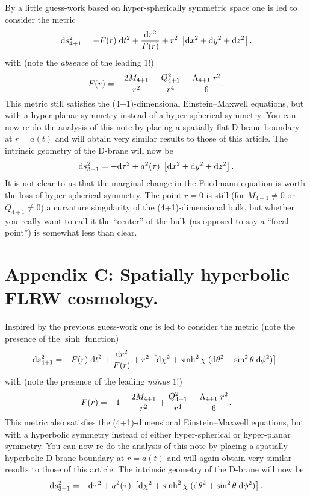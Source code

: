 \documentclass[a4paper,12pt]{article}
\begin{document}
By a little guess-work based on hyper-spherically symmetric {\RNdS}
space one is led to consider the metric
%
\begin{equation}
{\mathrm d} s^2_{4+1} = 
-  F(r)\; {\mathrm d} t^2 
+{{\mathrm d} r^2\over F(r)} 
+ r^2 \; \left[{\mathrm d} x^2 + {\mathrm d} y^2 + {\mathrm d} z^2 \right].
\end{equation}
%
with (note the {\em absence} of the leading $1$!)
%
\begin{equation}
F(r) =  - {2M_{4+1}\over r^2} 
+ {Q_{4+1}^2\over r^4} - {\Lambda_{4+1} \; r^2\over 6}.
\end{equation}
%
This metric still satisfies the (4+1)-dimensional Einstein--Maxwell
equations, but with a hyper-planar symmetry instead of a
hyper-spherical symmetry. You can now re-do the analysis of this note
by placing a spatially flat D-brane boundary at $r=a(t)$ and will
obtain very similar results to those of this article. The intrinsic
geometry of the D-brane will now be
%
\begin{equation}
{\mathrm d} s^2_{3+1} = - {\mathrm d} \tau^2  + a^2(\tau) \; \left[{\mathrm d} x^2 + {\mathrm d} y^2 + {\mathrm d} z^2 \right].
\end{equation}
%
It is not clear to us that the marginal change in the Friedmann
equation is worth the loss of hyper-spherical symmetry. The point
$r=0$ is still (for $M_{4+1}\neq0$ or $Q_{4+1}\neq0$) a curvature
singularity of the (4+1)-dimensional bulk, but whether you really want
to call it the ``center'' of the bulk (as opposed to say a ``focal
point'') is somewhat less than clear.



\section*{Appendix C: Spatially hyperbolic FLRW cosmology.}


Inspired by the previous guess-work one is led to consider the metric
(note the presence of the $\sinh$ function)
%
\begin{equation}
{\mathrm d} s^2_{4+1} = 
-  F(r)\; {\mathrm d} t^2 
+{{\mathrm d} r^2\over F(r)} 
+ r^2 \; \left[{\mathrm d}\chi^2 + 
\sinh^2\chi \; ({\mathrm d}\theta^2 + \sin^2\theta \; {\mathrm d}\phi^2)\right].
\end{equation}
%
with (note the presence of the leading {\em minus} $1$!)
%
\begin{equation}
F(r) =  -1- {2M_{4+1}\over r^2} 
+ {Q_{4+1}^2\over r^4} - {\Lambda_{4+1} \; r^2\over 6}.
\end{equation}
%
This metric also satisfies the (4+1)-dimensional Einstein--Maxwell
equations, but with a hyperbolic symmetry instead of either
hyper-spherical or hyper-planar symmetry. You can now re-do the
analysis of this note by placing a spatially hyperbolic D-brane
boundary at $r=a(t)$ and will again obtain very similar results to
those of this article.  The intrinsic geometry of the D-brane will now
be
%
\begin{equation}
{\mathrm d} s^2_{3+1} = - {\mathrm d} \tau^2  + a^2(\tau) \;  \left[{\mathrm d}\chi^2 + 
\sinh^2\chi \; ({\mathrm d}\theta^2 + \sin^2\theta \; {\mathrm d}\phi^2)\right].
\end{equation}
\end{document}
